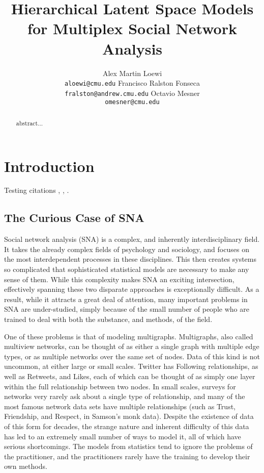 \documentclass{article}
\title{Hierarchical Latent Space Models\\for Multiplex Social Network Analysis}
\author{
  Alex Martin Loewi \\
  \texttt{aloewi@cmu.edu}
  \And
  Francisco Ralston Fonseca\\
  \texttt{fralston@andrew.cmu.edu}
  \And
  Octavio Mesner\\
  \texttt{omesner@cmu.edu}
}
\begin{document}

\maketitle

\begin{abstract}
  abstract...
\end{abstract}

\section{Introduction}

Testing citations \cite{10.2307/2290079}, \cite{kang2007,RSSB:RSSB12027}, \cite{hoff-2002, gollini-2016, salter-townshend2017}.

\subsection{The Curious Case of SNA}
Social network analysis (SNA) is a complex, and inherently interdisciplinary field. It takes the already complex fields of psychology and sociology, and focuses on the most interdependent processes in these disciplines. This then creates systems so complicated that sophisticated statistical models are necessary to make any sense of them. While this complexity makes SNA an exciting intersection, effectively spanning these two disparate approaches is exceptionally difficult. As a result, while it attracts a great deal of attention, many important problems in SNA are under-studied, simply because of the small number of people who are trained to deal with both the substance, and methods, of the field.

One of these problems is that of modeling multigraphs. Multigraphs, also called multiview networks, can be thought of as either a single graph with multiple edge types, or as multiple networks over the same set of nodes. Data of this kind is not uncommon, at either large or small scales. Twitter has Following relationships, as well as Retweets, and Likes, each of which can be thought of as simply one layer within the full relationship between two nodes. In small scales, surveys for networks very rarely ask about a single type of relationship, and many of the most famous network data sets have multiple relationships (such as Trust, Friendship, and Respect, in Samson's monk data). Despite the existence of data of this form for decades, the strange nature and inherent difficulty of this data has led to an extremely small number of ways to model it, all of which have serious shortcomings. The models from statistics tend to ignore the problems of the practitioner, and the practitioners rarely have the training to develop their own methods.
\end{document}
